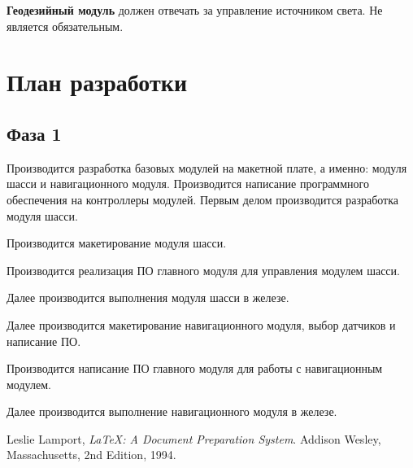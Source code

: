 \documentclass[utf8]{report}
\begin{document}
\textbf{Геодезийный модуль} должен отвечать за управление источником света. Не является обязательным.

\chapter{План разработки}

\section{Фаза 1}

Производится разработка базовых модулей на макетной плате, а именно: модуля шасси и навигационного модуля. Производится написание программного обеспечения на контроллеры модулей. Первым делом производится разработка модуля шасси.

Производится макетирование модуля шасси.

Производится реализация ПО главного модуля для управления модулем шасси.

Далее производится выполнения модуля шасси в железе.

Далее производится макетирование навигационного модуля, выбор датчиков и написание ПО.

Производится написание ПО главного модуля для работы с навигационным модулем.

Далее производится выполнение навигационного модуля в железе.


\begin{thebibliography}{9}
      Leslie Lamport,
      \emph{\LaTeX: A Document Preparation System}.
      Addison Wesley, Massachusetts,
      2nd Edition,
      1994.
 
\end{thebibliography}
 
\end{document}
